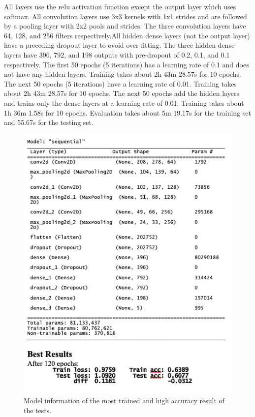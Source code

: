 All layers use the relu activation function except the output layer which uses softmax. All convolution layers use 3x3 kernels with 1x1 strides and are followed by a pooling layer with 2x2 pools and strides. The three convolution layers have 64, 128, and 256 filters respectively.All hidden dense layers (not the output layer) have a preceding dropout layer to ovoid over-fitting. The three hidden dense layers have 396, 792, and 198 outputs with pre-dropout of 0.2, 0.1, and 0.1 respectively. The first 50 epochs (5 iterations) has a learning rate of 0.1 and does not have any hidden layers. Training takes about 2h 43m 28.57s for 10 epochs. The next 50 epochs (5 iterations) have a learning rate of 0.01. Training takes about 2h 43m 28.57s for 10 epochs. The next 50 epochs add the hidden layers and trains only the dense layers at a learning rate of 0.01. Training takes about 1h 36m 1.58s for 10 epochs. Evaluation takes about 5m 19.17s for the training set and 55.67s for the testing set.

\begin{figure}[H]
\centering
\includegraphics[scale=0.85]{Media/Layers/result.png}
\caption{Model information of the most trained and high accuracy result of the tests.}
\label{figres}
\end{figure}


